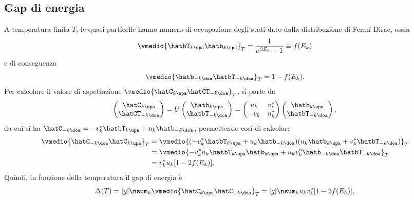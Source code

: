 \subsection{Gap di energia}
A temperatura finita $T$, le quasi-particelle hanno numero di occupazione degli stati dato dalla distribuzione di Fermi-Dirac, ossia
\begin{equation}
    \vmedio{\hatbT_{k\upa}\hatb_{k\upa}}_T = \frac{1}{e^{\beta E_k} + 1} \equiv f(E_k)
\end{equation}
e di conseguenza
\begin{equation}
    \vmedio{\hatb_{-k\doa}\hatbT_{-k\doa}}_T = 1 - f(E_k).
\end{equation}
Per calcolare il valore di aspettazione $\vmedio{\hatC_{k\upa}\hatCT_{-k\doa}}_T$, si parte da
\begin{equation}
    \begin{pmatrix}
        \hatC_{k\upa} \\
        \hatCT_{-k\doa}
    \end{pmatrix} = U
    \begin{pmatrix}
        \hatb_{k\upa} \\
        \hatbT_{-k\doa}
    \end{pmatrix} = 
    \begin{pmatrix}
        u_k & v_k^* \\
        -v_k & u_k^*
    \end{pmatrix}
    \begin{pmatrix}
        \hatb_{k\upa} \\
        \hatbT_{-k\doa}
    \end{pmatrix},
\end{equation}
da cui si ha $\hatC_{-k\doa} = -v_k^*\hatbT_{k\upa} + u_k\hatb_{-k\doa}$, permettendo così di calcolare
\begin{equation}
    \begin{split}
        \vmedio{\hatC_{-k\doa}\hatC_{k\upa}}_T & =\vmedio{(-v_k^*\hatbT_{k\upa} + u_k\hatb_{-k\doa})(u_k\hatb_{k\upa} + v_k^*\hatbT_{-k\doa})}_T \\
        &= \vmedio{-v_k^*u_k\hatbT_{k\upa}\hatb_{k\upa} + u_kv_k^*\hatb_{-k\doa}\hatbT_{-k\doa}}_T \\
        &= v_k^*u_k[1 - 2f(E_k)].
    \end{split}
\end{equation}
Quindi, in funzione della temperatura il gap di energia è
\begin{equation}
    \Delta(T) = |g|\nsum_k\vmedio{\hatC_{k\upa}\hatC_{-k\doa}}_T = |g|\nsum_k u_kv_k^*[1 - 2f(E_k)],
\end{equation}
